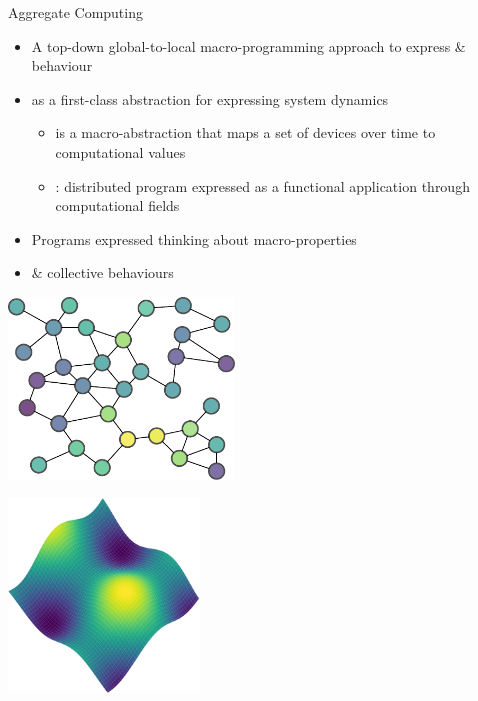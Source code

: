 \documentclass[9pt, aspectratio=169, handout]{beamer}
\begin{document}
\begin{frame}{Aggregate Computing}
  \begin{cardTiny}
    \begin{itemize}
      \item <1-> A top-down global-to-local macro-programming approach to express  \&  behaviour
      \item <2->  as a first-class abstraction for expressing system dynamics
      \begin{itemize}
        \item is a macro-abstraction that maps a set of devices over time to computational values
        \item [\success{\faThumbsUp}] : distributed program expressed as a functional application through computational fields
      \end{itemize}
    \end{itemize}
  \end{cardTiny}
  \begin{multicols}{2}
    \begin{card}[Benefits]
      \begin{itemize}
        \item Programs expressed thinking about macro-properties
        \item {} \&  collective behaviours
      \end{itemize}
    \end{card}
    \begin{cardTiny}
      \includegraphics[width=0.45\textwidth]{img/discrete.pdf}
      \hfill
      \parbox[c]{1em}{\color{primary}\vspace*{-6em}\Large \faArrowRight}
      \hfill
      \includegraphics[width=0.38\textwidth]{img/viridis-result.png}
    \end{cardTiny}
  \end{multicols}
\end{frame}
\end{document}

